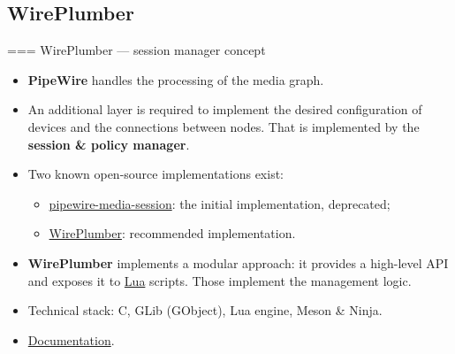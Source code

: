\subsection{WirePlumber}



=== {WirePlumber — session manager concept}
  \begin{itemize}

  \item \textbf{PipeWire} handles the processing of the media graph.

  \item An additional layer is required to implement the desired
    configuration of devices and the connections between nodes. That is
    implemented by the \textbf{session \& policy manager}.

  \item Two known open-source implementations exist:

    \begin{itemize}
    \item \href{https://gitlab.freedesktop.org/pipewire/media-session}{pipewire-media-session}:
      the initial implementation, deprecated;
    \item \href{https://pipewire.pages.freedesktop.org/wireplumber/}{WirePlumber}:
      recommended implementation.
    \end{itemize}

  \item \textbf{WirePlumber}
    implements a modular approach: it provides a high-level API and
    exposes it to \href{https://www.lua.org/}{Lua} scripts. Those
    implement the management logic.

  \item Technical stack: C, GLib (GObject), Lua engine, Meson \& Ninja.

  \item \href{https://pipewire.pages.freedesktop.org/wireplumber/}{Documentation}.

  \end{itemize}




